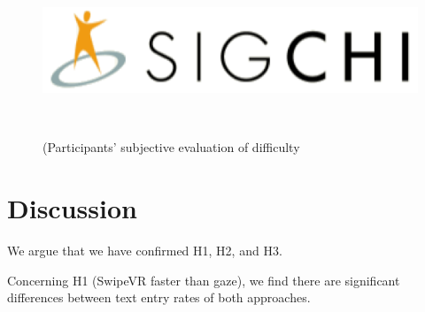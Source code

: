 \begin{figure}
\centering

  \includegraphics[width=0.9\columnwidth]{figures/sigchi-logo}

  \caption{(Participants' subjective evaluation of difficulty 
}~\label{fig:graphLikert}
\end{figure}

\section{Discussion}
We argue that we have confirmed H1, H2, and H3.

Concerning H1 (SwipeVR faster than gaze), we find there are significant differences between text entry rates of both approaches.

